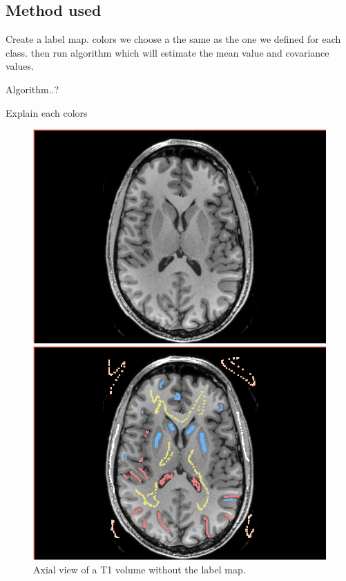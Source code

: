 \subsection{Method used}
%
Create a label map. colors we choose a the same as the one we defined for each class.
then run algorithm which will estimate the mean value and covariance values.
\par
%
Algorithm..?
%
\par
Explain each colors
\par
\begin{figure}\centering
\begin{minipage}[c]{.45\textwidth}\centering
  \includegraphics[width=.95\textwidth]{Images/Screenshots/T1ForLabel.png}
  \caption{Axial view of a T1 volume without the label map.}\label{fig:T1ForLabel}
\end{minipage}\hfill
\begin{minipage}[c]{.45\textwidth}\centering
  \includegraphics[width=.95\textwidth]{Images/Screenshots/LabelT1.png}

\end{minipage}
\end{figure}
